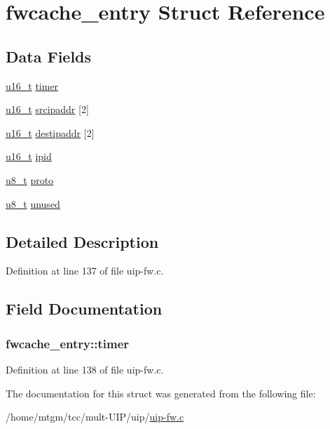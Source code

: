 \hypertarget{structfwcache__entry}{
\section{fwcache\_\-entry Struct Reference}
\label{structfwcache__entry}
}
\subsection*{Data Fields}
\begin{DoxyCompactItemize}
\item 
\hyperlink{group__uipfw_ga77570ac4fcab86864fa1916e55676da2}{u16\_\-t} \hyperlink{structfwcache__entry_a20f43ac6d38541dea02b51c4811d2a40}{timer}
\item 
\hyperlink{group__uipfw_ga77570ac4fcab86864fa1916e55676da2}{u16\_\-t} \hyperlink{group__uipfw_gaae48d38b90eb606c41fdd6cb5d56fb5c}{srcipaddr} \mbox{[}2\mbox{]}
\item 
\hyperlink{group__uipfw_ga77570ac4fcab86864fa1916e55676da2}{u16\_\-t} \hyperlink{group__uipfw_ga94a2ece9168dc271a4524391b05c5b23}{destipaddr} \mbox{[}2\mbox{]}
\item 
\hyperlink{group__uipfw_ga77570ac4fcab86864fa1916e55676da2}{u16\_\-t} \hyperlink{group__uipfw_ga870c863f3b770fb2ec8affdd01277326}{ipid}
\item 
\hyperlink{group__uipfw_ga4caecabca98b43919dd11be1c0d4cd8e}{u8\_\-t} \hyperlink{group__uipfw_ga2be7b4f6413d75eefbe43529a9838fd6}{proto}
\item 
\hyperlink{group__uipfw_ga4caecabca98b43919dd11be1c0d4cd8e}{u8\_\-t} \hyperlink{group__uipfw_ga4b6ce01bb79734997584ce27060dd544}{unused}
\end{DoxyCompactItemize}


\subsection{Detailed Description}


Definition at line 137 of file uip-\/fw.c.



\subsection{Field Documentation}
\hypertarget{structfwcache__entry_a20f43ac6d38541dea02b51c4811d2a40}{
\subsubsection[{timer}]{ {\bf fwcache\_\-entry::timer}}}
\label{structfwcache__entry_a20f43ac6d38541dea02b51c4811d2a40}


Definition at line 138 of file uip-\/fw.c.



The documentation for this struct was generated from the following file:\begin{DoxyCompactItemize}
\item 
/home/mtgm/tcc/mult-\/UIP/uip/\hyperlink{uip-fw_8c}{uip-\/fw.c}\end{DoxyCompactItemize}
